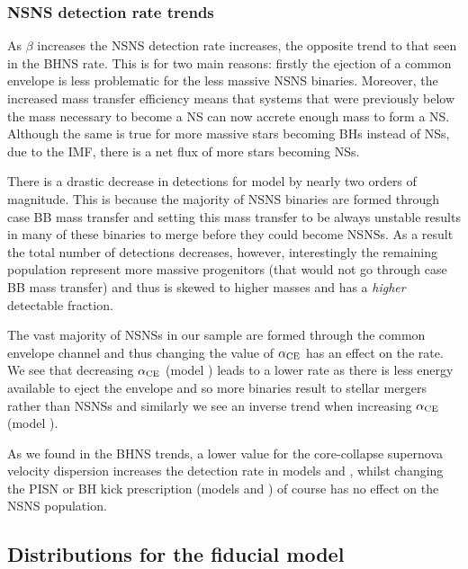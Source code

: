 \subsubsection{NSNS detection rate trends}\label{sec:NSNS_detection_trends}

As $\beta$ increases the NSNS detection rate increases, the opposite trend to that seen in the BHNS rate. This is for two main reasons: firstly the ejection of a common envelope is less problematic for the less massive NSNS binaries. Moreover, the increased mass transfer efficiency means that systems that were previously below the mass necessary to become a NS can now accrete enough mass to form a NS. Although the same is true for more massive stars becoming BHs instead of NSs, due to the IMF, there is a net flux of more stars becoming NSs.

There is a drastic decrease in detections for model \modCaseBB{} by nearly two orders of magnitude. This is because the majority of NSNS binaries are formed through case BB mass transfer and setting this mass transfer to be always unstable results in many of these binaries to merge before they could become NSNSs. As a result the total number of detections decreases, however, interestingly the remaining population represent more massive progenitors (that would not go through case BB mass transfer) and thus is skewed to higher masses and has a \textit{higher} detectable fraction.

The vast majority of NSNSs in our sample are formed through the common envelope channel and thus changing the value of $\alpha_{\rm CE}$ has an effect on the rate. We see that decreasing $\alpha_{\rm CE}$ (model \modAlphaLow) leads to a lower rate as there is less energy available to eject the envelope and so more binaries result to stellar mergers rather than NSNSs and similarly we see an inverse trend when increasing $\alpha_{\rm CE}$ (model \modAlphaHigh).

As we found in the BHNS trends, a lower value for the core-collapse supernova velocity dispersion increases the detection rate in models \modSigLow{} and \modSigLower{}, whilst changing the PISN or BH kick prescription (models \modNoPISN{} and \modNoBH{}) of course has no effect on the NSNS population.

\subsection{Distributions for the fiducial model}\label{sec:fiducial_distributions}

